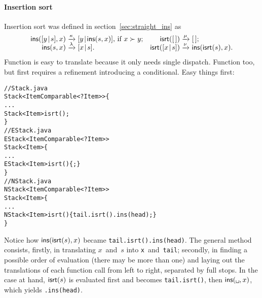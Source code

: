 \paragraph{Insertion sort}

Insertion sort was defined in section~\vref{sec:straight_ins} as
\begin{equation*}
\begin{array}{@{}r@{\;}l@{\;}lr@{\;}l@{\;}l@{}}
  \fun{ins}(\cons{y}{s},x)
& \xrightarrow{\smash{\kappa}}
& \cons{y}{\fun{ins}(s,x)}, \,\text{if \(x \succ y\)};
& \fun{isrt}(\el)
& \xrightarrow{\smash{\mu}}
& \el;\\
  \fun{ins}(s,x)
& \xrightarrow{\smash{\lambda}}
& \cons{x}{s}.
& \fun{isrt}(\cons{x}{s})
& \xrightarrow{\smash{\nu}}
& \fun{ins}(\fun{isrt}(s),x).
\end{array}
\end{equation*}
Function  is easy to translate because it only needs
single dispatch. Function  too, but first requires a refinement
introducing a conditional. Easy things first:
\begin{alltt}
// Stack.java
\public \abstractX
\class Stack<Item \extends Comparable<? \super Item>> \{
  ...
  \public \abstractX Stack<Item> isrt();
\}
// EStack.java
\public \class EStack<Item \extends Comparable<? \super Item>>
       \extends Stack<Item> \{
  ...
  \public EStack<Item> isrt() \{ \return \this; \}
\}
// NStack.java
\public \class NStack<Item \extends Comparable<? \super Item>>
       \extends Stack<Item> \{
  ...
  \public NStack<Item> isrt() \{\return tail.isrt().ins(head);\}
\}
\end{alltt}
Notice how \(\textsf{ins}(\textsf{isrt}(s),x)\) became
\texttt{tail.isrt().ins(head)}. The general method consists, firstly,
in translating \(x\)~and~\(s\) into \texttt{x}~and~\texttt{tail};
secondly, in finding a possible order of evaluation (there may be more
than one) and laying out the translations of each function call from
left to right, separated by full stops. In the case at hand,
\(\textsf{isrt}(s)\) is evaluated first and becomes \texttt{tail.isrt()},
then \(\fun{ins}(\texttt{\textvisiblespace},x)\), which yields
\texttt{\textvisiblespace.ins(head)}.

